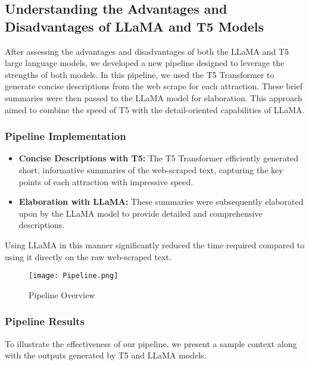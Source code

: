 \documentclass[conference]{IEEEtran}
\begin{document}
    \subsection{Understanding the Advantages and Disadvantages of LLaMA and T5 Models}

        After assessing the advantages and disadvantages of both the LLaMA and T5 large language models, we developed a new pipeline designed to leverage the strengths of both models. In this pipeline, we used the T5 Transformer to generate concise descriptions from the web scrape for each attraction. These brief summaries were then passed to the LLaMA model for elaboration. This approach aimed to combine the speed of T5 with the detail-oriented capabilities of LLaMA.\\

        \subsubsection{{\textbf{Pipeline Implementation}}}
            \begin{itemize}
                \item \textbf{Concise Descriptions with T5:} The T5 Transformer efficiently generated short, informative summaries of the web-scraped text, capturing the key points of each attraction with impressive speed.
                \item \textbf{Elaboration with LLaMA:} These summaries were subsequently elaborated upon by the LLaMA model to provide detailed and comprehensive descriptions.
            \end{itemize}


            Using LLaMA in this manner significantly reduced the time required compared to using it directly on the raw web-scraped text.

            \begin{figure}
                \centering
                \texttt{[image: Pipeline.png]}
                \caption{Pipeline Overview}
                \label{fig:pipeline}
            \end{figure}

        \subsubsection{\textbf{Pipeline Results}}

            To illustrate the effectiveness of our pipeline, we present a sample context along with the outputs generated by T5 and LLaMA models.
\end{document}
